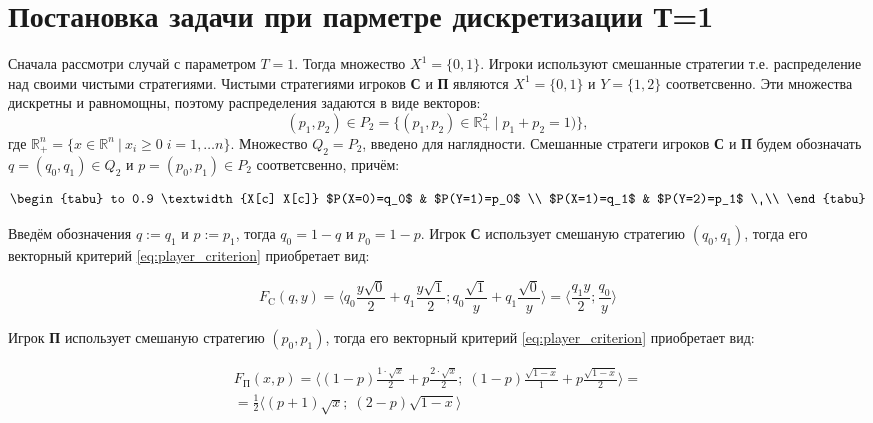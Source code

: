 \section{Постановка задачи при парметре дискретизации Т=1}

Сначала рассмотри случай с параметром $T=1$. Тогда множество $X^1=\{0, 1\}$.
Игроки используют смешанные стратегии т.е. распределение над своими чистыми 
стратегиями.
Чистыми стратегиями игроков \textbf{С} и \textbf{П} являются $X^1=\{0, 1\}$ и 
$Y=\{1,2\}$ соответсвенно. Эти множества дискретны и равномощны, поэтому 
распределения задаются в виде векторов: 
$$
	(p_1, p_2) \in P_2 = \{
		(p_1, p_2) \in \mathbb{R}_+^2 \; | \; p_1 + p_2 = 1)
	\},
$$
где $
	\mathbb{R}_+^n = \{ x \in \mathbb{R}^n \: | \: 
	x_i \geqslant 0 \; i = 1, \ldots n\}
$.
Множество $Q_2=P_2$, введено для наглядности. 
Смешанные стратеги игроков \textbf{С} и \textbf{П} будем обозначать
$q=(q_0,q_1) \in Q_2$ и $p=(p_0,p_1) \in P_2$ соответсвенно, причём:

\begin{equation}
\begin{tabu} to 0.9 \textwidth {X[c] X[c]}
	$P(X=0)=q_0$ & $P(Y=1)=p_0$ \\
	$P(X=1)=q_1$ & $P(Y=2)=p_1$ \
	\\
	\end{tabu}	
\label{eq:probability_1}
\end{equation}

Введём обозначения $q := q_1$ и $p := p_1$, тогда $q_0 = 1-q$ и $p_0 = 1 - p$. 
Игрок \textbf{С} использует смешаную стратегию  $(q_0,q_1)$, тогда
его векторный критерий \eqref{eq:player_criterion} приобретает вид: 

$$
	F_\textrm{C}(q,y)=
	\big \langle
		q_0\frac{y\sqrt{0}}{2} + 
		q_1\frac{y\sqrt{1}}{2};
		q_0\frac{\sqrt{1}}{y} +
		q_1\frac{\sqrt{0}}{y}
	\big \rangle 
	= 	
	\big \langle
		\frac{q_1y}{2};
		\frac{q_0}{y}
	\big \rangle 
$$

Игрок \textbf{П} использует смешаную стратегию  $(p_0,p_1)$, тогда
его векторный критерий \eqref{eq:player_criterion} приобретает вид: 

\begin{gather*}
	F_\textrm{П}(x,p)=
	\big \langle 
		(1-p)\frac{1 \cdot \sqrt{x}}{2} + p \frac{2 \cdot \sqrt{x}}{2}; \;
		(1-p)\frac{\sqrt{1-x}}{1}+p\frac{\sqrt{1-x}}{2} 
	\big \rangle=
	\\
	=\frac{1}{2}
	\big \langle
		(p+1)\sqrt{x}; \;
		(2-p)\sqrt{1-x}
	\big \rangle
\end{gather*}
	
